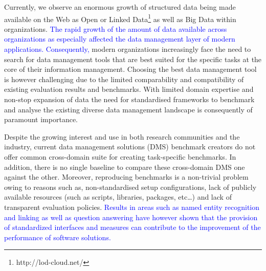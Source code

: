 \documentclass{llncs}
\newcommand{\todoinline}[1]{
    \todo[inline]{#1}
}
\begin{document}
Currently, we observe an enormous growth of structured data being made available on the Web as Open or Linked Data\footnote{http://lod-cloud.net/} as well as Big Data within organizations. 
\textcolor{blue}{The rapid growth of the amount of data available across organizations as especially affected the data management layer of modern applications. Consequently, }
modern organizations increasingly face the need to search for data management tools that are best suited for the specific tasks at the core of their information management. 
Choosing the best data management tool is however challenging due to the limited comparability and compatibility of existing evaluation results and benchmarks. 
With limited domain expertise and non-stop expansion of data the need for standardised frameworks to benchmark and analyse the existing diverse data management landscape is consequently of paramount importance.

Despite the growing interest and use in both research communities and the industry, current data management solutions (DMS) benchmark creators \todoinline{add references} do not offer common cross-domain suite for creating task-specific benchmarks. In addition, there is no single baseline to compare these cross-domain DMS one against the other. 
Moreover, reproducing benchmarks is a non-trivial problem owing to reasons such as, non-standardised setup configurations, lack of publicly available resources (such as scripts, libraries, packages, etc\dots) and lack of transparent evaluation policies. 
\textcolor{blue}{Results in areas such as named entity recognition and linking \cite{gerbil} as well as question answering \cite{qald,bioasq} have however shown that the provision of standardized interfaces and measures can contribute to the improvement of the performance of software solutions.}      
    
\end{document}

